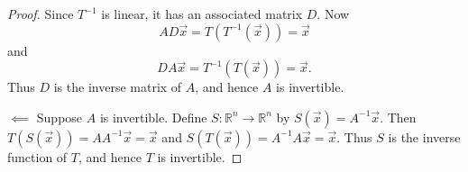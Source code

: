 \documentclass[12pt,letterpaper]{article}
\begin{document}
\begin{enumerate}
\begin{proof}
  Since $T^{-1}$ is linear, it has an associated matrix $D$. Now $$AD\vec{x} =T(T^{-1}(\vec{x}))=\vec{x}$$ and $$DA\vec{x} =T^{-1}(T(\vec{x})) =\vec{x}.$$ Thus $D$ is the inverse matrix of $A$, and hence $A$ is invertible. 
  
  $\impliedby$ Suppose $A$ is invertible. Define $S: \mathbb{R}^n \to \mathbb{R}^n$ by $S(\vec{x})=A^{-1}\vec{x}$. Then $T(S(\vec{x}))=AA^{-1}\vec{x} = \vec{x}$ and $S(T(\vec{x})) =A^{-1}A\vec{x}=\vec{x}$. Thus $S$ is the inverse function of $T$, and hence $T$ is invertible. 
  \end{proof}
\end{enumerate}
\end{document}
